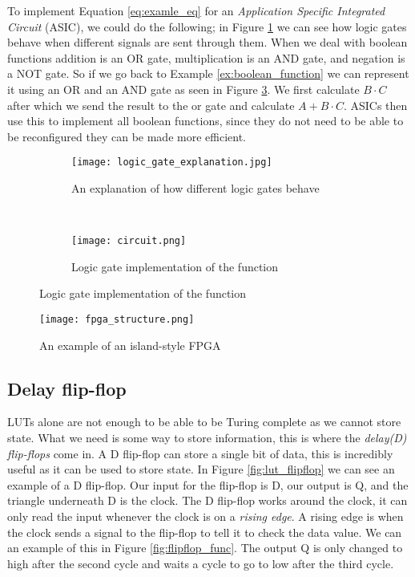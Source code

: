 To implement Equation \ref{eq:examle_eq} for an \textit{Application Specific Integrated
Circuit} (ASIC), we could do the following; in Figure
\ref{fig:logic_gate_explanation} we can see how logic gates behave when
different signals are sent through them. When we deal with boolean functions
addition is an OR gate, multiplication is an AND gate, and negation is a NOT
gate. So if we go back to Example \ref{ex:boolean_function} we can represent it
using an OR and an AND gate as seen in Figure \ref{fig:logic_gate_impl}. We first
calculate $B \cdot C$ after which we send the result to the or gate and
calculate $A + B \cdot C$. ASICs then use this to implement all boolean
functions, since they do not need to be able to be reconfigured they can be
made more efficient.

\begin{figure}[H]
    \centering
    \begin{subfigure}[b]{.4\textwidth}
        \centering
        \texttt{[image: logic\_gate\_explanation.jpg]}
        \caption{An explanation of how different logic gates behave\citep{LogicGateBehavior}}
        \label{fig:logic_gate_explanation}
    \end{subfigure}
    ~
    \begin{subfigure}[b]{.4\textwidth}
        \centering
        \texttt{[image: circuit.png]}
        \caption{Logic gate implementation of the function}
        \label{fig:logic_gate_impl}
    \end{subfigure}
\end{figure}

\begin{figure}[H]
    \centering
    \texttt{[image: fpga\_structure.png]}
    \caption{An example of an island-style FPGA\citep{M.MorrisMano3}}
    \label{fig:fpga_structure}
\end{figure}

\subsection{Delay flip-flop}
LUTs alone are not enough to be able to be Turing complete as we cannot store
state. What we need is some way to store information, this is where the
\textit{delay(D) flip-flops} come in. A D flip-flop can store a single bit of
data, this is incredibly useful as it can be used to store state. In Figure
\ref{fig:lut_flipflop} we can see an example of a D flip-flop. Our input for
the flip-flop is D, our output is Q, and the triangle underneath D is the
clock. The D flip-flop works around the clock, it can only read the input
whenever the clock is on a \textit{rising edge}. A rising edge is when the
clock sends a signal to the flip-flop to tell it to check the data value. We
can an example of this in Figure \ref{fig:flipflop_func}. The output Q is only
changed to high after the second cycle and waits a cycle to go to low after the
third cycle.

